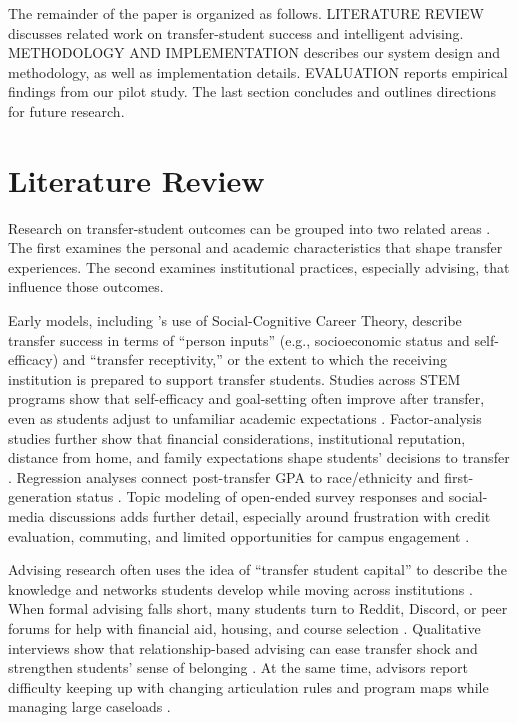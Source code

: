 \documentclass[letterpaper,11pt]{article}
\begin{document}
The remainder of the paper is organized as follows. LITERATURE REVIEW discusses related work on transfer-student success and intelligent advising. METHODOLOGY AND IMPLEMENTATION describes our system design and methodology, as well as implementation details. EVALUATION reports empirical findings from our pilot study. The last section concludes and outlines directions for future research.

\section{Literature Review}\label{sec:literature}

Research on transfer-student outcomes can be grouped into two related areas \parencite{factoranalysis2023}. The first examines the personal and academic characteristics that shape transfer experiences. The second examines institutional practices, especially advising, that influence those outcomes.

Early models, including \textcite{computingtransfer2024}'s use of Social-Cognitive Career Theory, describe transfer success in terms of ``person inputs'' (e.g., socioeconomic status and self-efficacy) and ``transfer receptivity,'' or the extent to which the receiving institution is prepared to support transfer students. Studies across STEM programs show that self-efficacy and goal-setting often improve after transfer, even as students adjust to unfamiliar academic expectations \parencite{socialcognitive2022}. Factor-analysis studies further show that financial considerations, institutional reputation, distance from home, and family expectations shape students' decisions to transfer \parencite{factoranalysis2023}. Regression analyses connect post-transfer GPA to race/ethnicity and first-generation status \parencite{computingtransfer2024}. Topic modeling of open-ended survey responses and social-media discussions adds further detail, especially around frustration with credit evaluation, commuting, and limited opportunities for campus engagement \parencite{standfast2024reddit}.

Advising research often uses the idea of ``transfer student capital'' to describe the knowledge and networks students develop while moving across institutions \parencite{lukszo2020}. When formal advising falls short, many students turn to Reddit, Discord, or peer forums for help with financial aid, housing, and course selection \parencite{standfast2024reddit}. Qualitative interviews show that relationship-based advising can ease transfer shock and strengthen students' sense of belonging \parencite{thiry2023}. At the same time, advisors report difficulty keeping up with changing articulation rules and program maps while managing large caseloads \parencite{nguyen2024community,nguyen2025school}.
\end{document}
